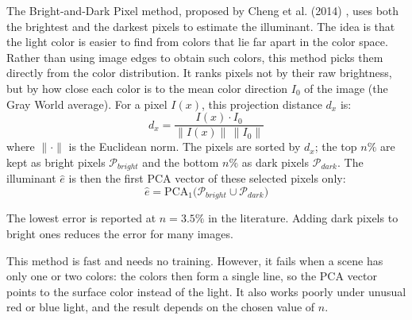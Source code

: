 The Bright-and-Dark Pixel method, proposed by Cheng et al. (2014) \cite{cheng2014illuminant}, uses both the brightest and the darkest pixels to estimate the illuminant. The idea is that the light color is easier to find from colors that lie far apart in the color space. Rather than using image edges to obtain such colors, this method picks them directly from the color distribution. It ranks pixels not by their raw brightness, but by how close each color is to the mean color direction $I_0$ of the image (the Gray World average). For a pixel $I(x)$, this projection distance $d_x$ is:
\begin{equation}
d_x = \frac{I(x) \cdot I_0}{\|I(x)\|\,\|I_0\|}
\end{equation}
where $\|\cdot\|$ is the Euclidean norm. The pixels are sorted by $d_x$; the top $n\%$ are kept as bright pixels $\mathcal{P}_{bright}$ and the bottom $n\%$ as dark pixels $\mathcal{P}_{dark}$. The illuminant $\hat{e}$ is then the first PCA vector of these selected pixels only:
\begin{equation}
\hat{e} = \mathrm{PCA}_1\big(\mathcal{P}_{bright} \cup \mathcal{P}_{dark}\big)
\end{equation}

The lowest error is reported at $n = 3.5\%$ in the literature. Adding dark pixels to bright ones reduces the error for many images.

This method is fast and needs no training. However, it fails when a scene has only one or two colors: the colors then form a single line, so the PCA vector points to the surface color instead of the light. It also works poorly under unusual red or blue light, and the result depends on the chosen value of $n$.

